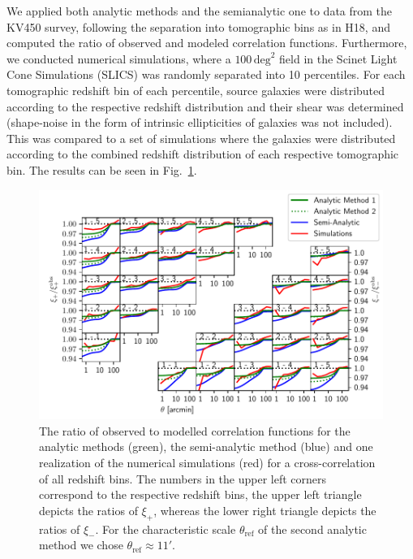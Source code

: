 \documentclass[referee]{aa} %
\renewcommand{\[}{\begin{equation}}
\renewcommand{\]}{\end{equation}}
\renewcommand{\rm}{\mathrm}
\begin{document}
We applied both analytic methods and the semianalytic one to data from the KV450 survey, following the separation into tomographic bins as in H18, and computed the ratio of observed and modeled correlation functions. Furthermore, we conducted numerical simulations, where a $100\,\rm{deg}^2$ field in the Scinet Light Cone Simulations (SLICS) \citep{2018MNRAS.481.1337H} was randomly separated into 10 percentiles. For each tomographic redshift bin of each percentile, source galaxies were distributed according to the respective redshift distribution and their shear was determined (shape-noise in the form of intrinsic ellipticities of galaxies was not included). This was compared to a set of simulations where the galaxies were distributed according to the combined redshift distribution of each respective tomographic bin. The results can be seen in Fig.~\ref{fig:all_xis}.
	\begin{figure}
	\centering
	\includegraphics[width=1\textwidth]{images/xis_all.pdf}
	\caption{The ratio of observed to modelled correlation functions for the analytic methods (green), the semi-analytic method (blue) and one realization of the numerical simulations (red) for a cross-correlation of all redshift bins. The numbers in the upper left corners correspond to the respective redshift bins, the upper left triangle depicts the ratios of $\xi_+$, whereas the lower right triangle depicts the ratios of $\xi_-$. For the characteristic scale $\theta_{\rm{ref}}$ of the second analytic method we chose $\theta_{\rm{ref}} \approx 11'$.}
	\label{fig:all_xis}
	\end{figure}
\end{document}
